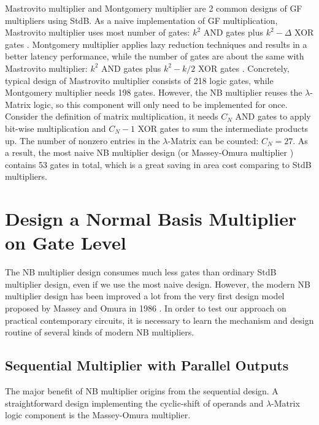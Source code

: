 
Mastrovito multiplier and Montgomery multiplier are 2 common designs
of GF multipliers using StdB. As a naive implementation of GF multiplication,
Mastrovito multiplier uses most number of gates:
$k^2$ AND gates plus $k^2-\Delta$ XOR gates \cite{Mastrovito}. Montgomery multiplier 
applies lazy reduction techniques and results in a better latency performance, while the number of gates are about
the same with Mastrovito multiplier:
$k^2$ AND gates plus $k^2-k/2$ XOR gates \cite{Montgomery}. 
Concretely, typical design of Mastrovito multiplier consists of 218 logic gates, while 
Montgomery multiplier needs 198 gates. However, the NB multiplier reuses the $\lambda$-Matrix 
logic, so this component will only need to be implemented for once. 
Consider the definition of matrix multiplication, it needs $C_N$ AND gates to apply 
bit-wise multiplication and $C_N-1$ XOR gates to sum the intermediate products up. The number of nonzero entries
in the $\lambda$-Matrix can be counted: $C_N = 27$.
As a result, the most naive NB multiplier design (or Massey-Omura multiplier \cite{MasseyOmura})
contains 53 gates in total, which is a great saving in area cost comparing to StdB multipliers.

\section{Design a Normal Basis Multiplier on Gate Level}
The NB multiplier design consumes much less gates than ordinary StdB multiplier design, even if 
we use the most naive design. However, the modern NB multiplier design has been improved a lot from the 
very first design model proposed by Massey and Omura in 1986 \cite{MasseyOmura}. In order to 
test our approach on practical contemporary circuits, it is necessary to learn the mechanism and design 
routine of several kinds of modern NB multipliers.
\subsection{Sequential Multiplier with Parallel Outputs}
The major benefit of NB multiplier origins from the sequential design. A straightforward design implementing 
the cyclic-shift of operands and $\lambda$-Matrix logic component is the Massey-Omura multiplier.

